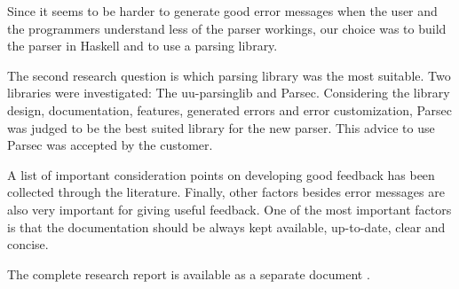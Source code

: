 Since it seems to be harder to generate good error messages when the user and the programmers understand less of the parser workings, our choice was to build the parser in Haskell and to use a parsing library.

The second research question is which parsing library was the most suitable.
Two libraries were investigated: The uu-parsinglib and Parsec.
Considering the library design, documentation, features, generated errors and error customization, Parsec was judged to be the best suited library for the new parser.
This advice to use Parsec was accepted by the customer.

A list of important consideration points on developing good feedback has been collected through the literature.
Finally, other factors besides error messages are also very important for giving useful feedback.
One of the most important factors is that the documentation should be always kept available, up-to-date, clear and concise.

The complete research report is available as a separate document .
